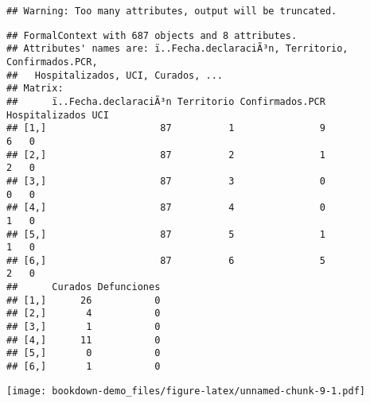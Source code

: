 \documentclass[
]{book}
\newenvironment{Shaded}{\begin{snugshade}}{\end{snugshade}}
\newcommand{\KeywordTok}[1]{\textcolor[rgb]{0.13,0.29,0.53}{\textbf{#1}}}
\newcommand{\NormalTok}[1]{#1}
\newcommand{\OperatorTok}[1]{\textcolor[rgb]{0.81,0.36,0.00}{\textbf{#1}}}
\begin{document}
\begin{verbatim}
## Warning: Too many attributes, output will be truncated.
\end{verbatim}

\begin{verbatim}
## FormalContext with 687 objects and 8 attributes.
## Attributes' names are: ï..Fecha.declaraciÃ³n, Territorio, Confirmados.PCR,
##   Hospitalizados, UCI, Curados, ...
## Matrix:
##      ï..Fecha.declaraciÃ³n Territorio Confirmados.PCR Hospitalizados UCI
## [1,]                    87          1               9              6   0
## [2,]                    87          2               1              2   0
## [3,]                    87          3               0              0   0
## [4,]                    87          4               0              1   0
## [5,]                    87          5               1              1   0
## [6,]                    87          6               5              2   0
##      Curados Defunciones
## [1,]      26           0
## [2,]       4           0
## [3,]       1           0
## [4,]      11           0
## [5,]       0           0
## [6,]       1           0
\end{verbatim}

\begin{Shaded}
\end{Shaded}

\texttt{[image: bookdown-demo\_files/figure-latex/unnamed-chunk-9-1.pdf]}

\begin{Shaded}
\end{Shaded}
\end{document}
